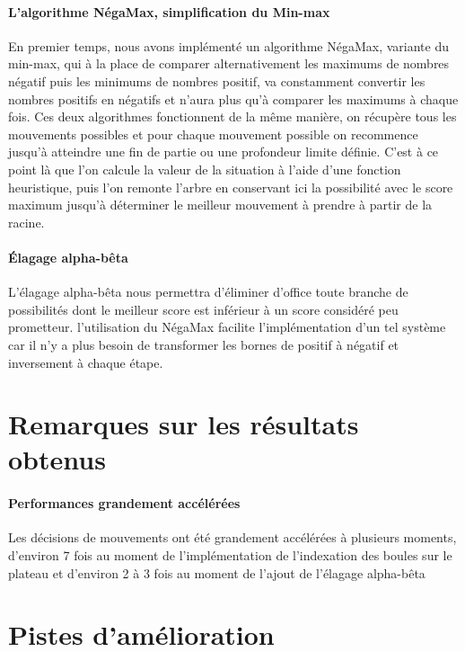 \documentclass{scrreprt}
\begin{document}
		
			\paragraph{L'algorithme NégaMax, simplification du Min-max}
			
			En premier temps, nous avons implémenté un algorithme NégaMax, variante du min-max, qui à la place de comparer alternativement les maximums de nombres négatif puis les minimums de nombres positif, va constamment convertir les nombres positifs en négatifs et n'aura plus qu'à comparer les maximums à chaque fois. Ces deux algorithmes fonctionnent de la même manière, on récupère tous les mouvements possibles et pour chaque mouvement possible on recommence jusqu'à atteindre une fin de partie ou une profondeur limite définie. C'est à ce point là que l'on calcule la valeur de la situation à l'aide d'une fonction heuristique, puis l'on remonte l'arbre en conservant ici la possibilité avec le score maximum jusqu'à déterminer le meilleur mouvement à prendre à partir de la racine.  
			
			\paragraph{Élagage alpha-bêta}
			
			L'élagage alpha-bêta nous permettra d'éliminer d'office toute branche de possibilités dont le meilleur score est inférieur à un score considéré peu prometteur. l'utilisation du NégaMax facilite l'implémentation d'un tel système car il n'y a plus besoin de transformer les bornes de positif à négatif et inversement à chaque étape.
			
				
		
		\section{Remarques sur les résultats obtenus}
			\paragraph{Performances grandement accélérées}
			
			Les décisions de mouvements ont été grandement accélérées à plusieurs moments, d'environ 7 fois au moment de l'implémentation de l'indexation des boules sur le plateau et  d'environ 2 à 3 fois au moment de l'ajout de l'élagage alpha-bêta
			
			
		\section{Pistes d'amélioration}
			
\end{document}
